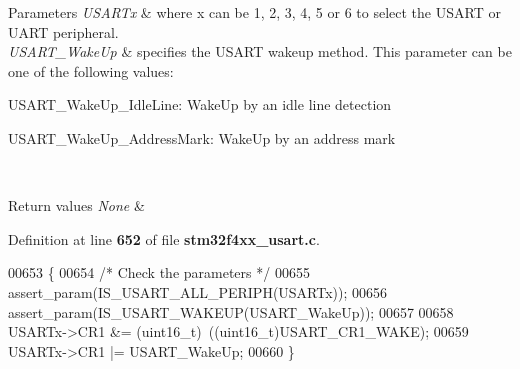 \begin{DoxyParams}{Parameters}
{\em U\+S\+A\+R\+Tx} & where x can be 1, 2, 3, 4, 5 or 6 to select the U\+S\+A\+RT or U\+A\+RT peripheral. \\
\hline
{\em U\+S\+A\+R\+T\+\_\+\+Wake\+Up} & specifies the U\+S\+A\+RT wakeup method. This parameter can be one of the following values\+: \begin{DoxyItemize}
\item U\+S\+A\+R\+T\+\_\+\+Wake\+Up\+\_\+\+Idle\+Line\+: Wake\+Up by an idle line detection \item U\+S\+A\+R\+T\+\_\+\+Wake\+Up\+\_\+\+Address\+Mark\+: Wake\+Up by an address mark \end{DoxyItemize}
\\
\hline
\end{DoxyParams}

\begin{DoxyRetVals}{Return values}
{\em None} & \\
\hline
\end{DoxyRetVals}


Definition at line \textbf{ 652} of file \textbf{ stm32f4xx\+\_\+usart.\+c}.


\begin{DoxyCode}
00653 \{
00654   \textcolor{comment}{/* Check the parameters */}
00655   assert_param(IS_USART_ALL_PERIPH(USARTx));
00656   assert_param(IS_USART_WAKEUP(USART\_WakeUp));
00657   
00658   USARTx->CR1 &= (uint16\_t)~((uint16\_t)USART_CR1_WAKE);
00659   USARTx->CR1 |= USART\_WakeUp;
00660 \}
\end{DoxyCode}
